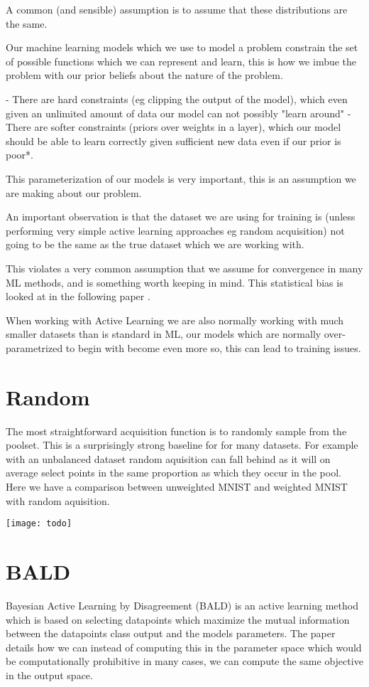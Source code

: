 \documentclass[12pt, a4paper]{report}
\theoremstyle{definition}
\begin{document}
A common (and sensible) assumption is to assume that these distributions are the same.

Our machine learning models which we use to model a problem constrain the set of possible functions which we can represent and learn, this is how we imbue the problem with our prior beliefs about the nature of the problem.

- There are hard constraints (eg clipping the output of the model), which even given an unlimited amount of data our model can not possibly "learn around"
- There are softer constraints (priors over weights in a layer), which our model should be able to learn correctly given sufficient new data even if our prior is poor*.

This parameterization of our models is very important, this is an assumption we are making about our problem.

An important observation is that the dataset we are using for training is (unless performing very simple active learning approaches eg random acquisition) not going to be the same as the true dataset which we are working with. 

This violates a very common assumption that we assume for convergence in many ML methods, and is something worth keeping in mind. This statistical bias is looked at in the following paper \cite{farquhar2021statistical}.

When working with Active Learning we are also normally working with much smaller datasets than is standard in ML, our models which are normally over-parametrized to begin with become even more so, this can lead to training issues.

\section{Random}

The most straightforward acquisition function is to randomly sample from the poolset. This is a surprisingly strong baseline for for many datasets. For example with an unbalanced dataset random aquisition can fall behind as it will on average select points in the same proportion as which they occur in the pool. Here we have a comparison between unweighted MNIST and weighted MNIST with random aquisition.

\texttt{[image: todo]}


\section{BALD}
Bayesian Active Learning by Disagreement (BALD) \cite{houlsby2011bayesian} is an active learning method which is based on selecting datapoints which maximize the mutual information between the datapoints class output and the models parameters. The paper details how we can instead of computing this in the parameter space which would be computationally prohibitive in many cases, we can compute the same objective in the output space.
\end{document}
